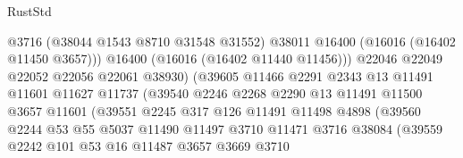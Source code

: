 \begin{lexlean}{RustStd}
\begin{coremodule}
                                      @3716
                                      (@38044 @1543 @8710 @31548 @31552)
                                      @38011
                                      @16400
                                      (@16016 (@16402 @11450 @3657)))
                                    @16400
                                    (@16016 (@16402 @11440 @11456)))
                                  @22046
                                  @22049
                                  @22052
                                  @22056
                                  @22061
                                  @38930)
                                (@39605
                                  @11466
                                  @2291
                                  @2343
                                  @13
                                  @11491
                                  @11601
                                  @11627
                                  @11737
                                  (@39540
                                    @2246
                                    @2268
                                    @2290
                                    @13
                                    @11491
                                    @11500
                                    @3657
                                    @11601
                                    (@39551
                                      @2245
                                      @317
                                      @126
                                      @11491
                                      @11498
                                      @4898
                                      (@39560
                                        @2244
                                        @53
                                        @55
                                        @5037
                                        @11490
                                        @11497
                                        @3710
                                        @11471
                                        @3716
                                        @38084
                                        (@39559
                                          @2242
                                          @101
                                          @53
                                          @16
                                          @11487
                                          @3657
                                          @3669
                                          @3710

\end{coremodule}
\end{lexlean}
